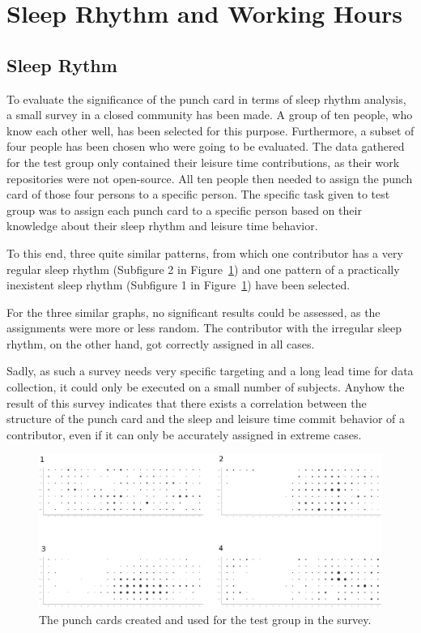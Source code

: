 \section{Sleep Rhythm and Working Hours}

\subsection{Sleep Rythm}
To evaluate the significance of the punch card in terms of sleep rhythm analysis, a small survey in a closed community has been made.
A group of ten people, who know each other well, has been selected for this purpose.
Furthermore, a subset of four people has been chosen who were going to be evaluated.
The data gathered for the test group only contained their leisure time contributions, as their work repositories were not open-source.
All ten people then needed to assign the punch card of those four persons to a specific person.
The specific task given to test group was to assign each punch card to a specific person based on their knowledge about their sleep rhythm and leisure time behavior.

To this end, three quite similar patterns, from which one contributor has a very regular sleep rhythm (Subfigure 2 in Figure~\ref{fig:punchcard-survey}) and one pattern of a practically inexistent sleep rhythm (Subfigure 1 in Figure~\ref{fig:punchcard-survey}) have been selected.

For the three similar graphs, no significant results could be assessed, as the assignments were more or less random.
The contributor with the irregular sleep rhythm, on the other hand, got correctly assigned in all cases.

Sadly, as such a survey needs very specific targeting and a long lead time for data collection, it could only be executed on a small number of subjects.
Anyhow the result of this survey indicates that there exists a correlation between the structure of the punch card and the sleep and leisure time commit behavior of a contributor, even if it can only be accurately assigned in extreme cases.


\begin{figure}[H]
    \includegraphics[scale=0.16]{./graphs/analysis/survey_combined}
    \centering
    \caption{The punch cards created and used for the test group in the survey.}\label{fig:punchcard-survey}
\end{figure}

